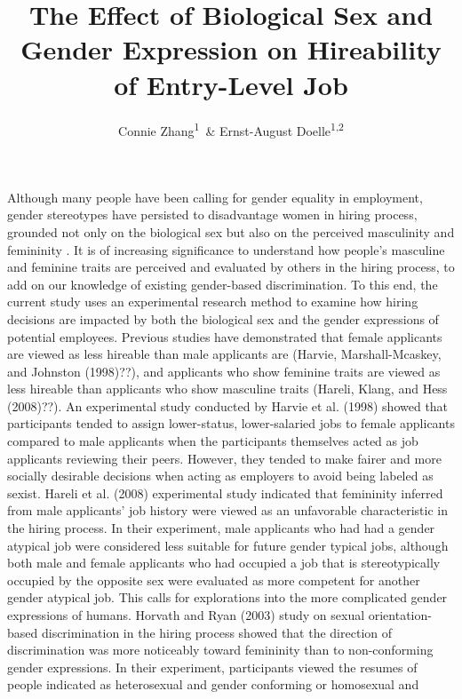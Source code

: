 \documentclass[english,man]{apa6}
\title{The Effect of Biological Sex and Gender Expression on Hireability of
Entry-Level Job}
\author{Connie Zhang\textsuperscript{1}~\& Ernst-August Doelle\textsuperscript{1,2}}
\affiliation{
    \vspace{0.5cm}
          \textsuperscript{1} Smith College\\
          \textsuperscript{2} Konstanz Business School  }
\theoremstyle{definition}
\theoremstyle{definition}
\theoremstyle{remark}
\begin{document}
\maketitle

\setcounter{secnumdepth}{0}



Although many people have been calling for gender equality in
employment, gender stereotypes have persisted to disadvantage women in
hiring process, grounded not only on the biological sex but also on the
perceived masculinity and femininity \citet{har98}. It is of increasing
significance to understand how people's masculine and feminine traits
are perceived and evaluated by others in the hiring process, to add on
our knowledge of existing gender-based discrimination. To this end, the
current study uses an experimental research method to examine how hiring
decisions are impacted by both the biological sex and the gender
expressions of potential employees. Previous studies have demonstrated
that female applicants are viewed as less hireable than male applicants
are (Harvie, Marshall-Mcaskey, and Johnston (1998)??), and applicants
who show feminine traits are viewed as less hireable than applicants who
show masculine traits (Hareli, Klang, and Hess (2008)??). An
experimental study conducted by Harvie et al. (1998) showed that
participants tended to assign lower-status, lower-salaried jobs to
female applicants compared to male applicants when the participants
themselves acted as job applicants reviewing their peers. However, they
tended to make fairer and more socially desirable decisions when acting
as employers to avoid being labeled as sexist. Hareli et al. (2008)
experimental study indicated that femininity inferred from male
applicants' job history were viewed as an unfavorable characteristic in
the hiring process. In their experiment, male applicants who had had a
gender atypical job were considered less suitable for future gender
typical jobs, although both male and female applicants who had occupied
a job that is stereotypically occupied by the opposite sex were
evaluated as more competent for another gender atypical job. This calls
for explorations into the more complicated gender expressions of humans.
Horvath and Ryan (2003) study on sexual orientation-based discrimination
in the hiring process showed that the direction of discrimination was
more noticeably toward femininity than to non-conforming gender
expressions. In their experiment, participants viewed the resumes of
people indicated as heterosexual and gender conforming or homosexual and
\end{document}
